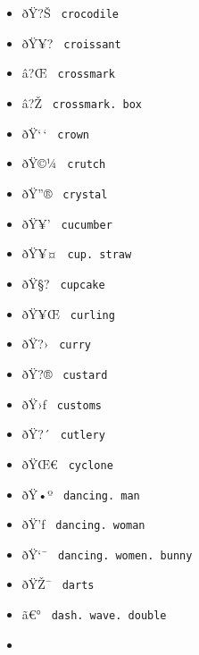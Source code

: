 \begin{itemize}
\item
  \label{symbol-crocodile}{{ ðŸ?Š }
  \texttt{\ crocodile\ }}
\item
  \label{symbol-croissant}{{ ðŸ¥? }
  \texttt{\ croissant\ }}
\item
  \label{symbol-crossmark}{{ â?Œ }
  \texttt{\ crossmark\ }}
\item
  \label{symbol-crossmark.box}{{ â?Ž }
  \texttt{\ crossmark.\ box\ }}
\item
  \label{symbol-crown}{{ ðŸ`\,` } \texttt{\ crown\ }}
\item
  \label{symbol-crutch}{{ ðŸ©¼ } \texttt{\ crutch\ }}
\item
  \label{symbol-crystal}{{ ðŸ''® } \texttt{\ crystal\ }}
\item
  \label{symbol-cucumber}{{ ðŸ¥' } \texttt{\ cucumber\ }}
\item
  \label{symbol-cup.straw}{{ ðŸ¥¤ }
  \texttt{\ cup.\ straw\ }}
\item
  \label{symbol-cupcake}{{ ðŸ§? } \texttt{\ cupcake\ }}
\item
  \label{symbol-curling}{{ ðŸ¥Œ } \texttt{\ curling\ }}
\item
  \label{symbol-curry}{{ ðŸ?› } \texttt{\ curry\ }}
\item
  \label{symbol-custard}{{ ðŸ?® } \texttt{\ custard\ }}
\item
  \label{symbol-customs}{{ ðŸ›ƒ } \texttt{\ customs\ }}
\item
  \label{symbol-cutlery}{{ ðŸ?´ } \texttt{\ cutlery\ }}
\item
  \label{symbol-cyclone}{{ ðŸŒ€ } \texttt{\ cyclone\ }}
\item
  \label{symbol-dancing.man}{{ ðŸ•º }
  \texttt{\ dancing.\ man\ }}
\item
  \label{symbol-dancing.woman}{{ ðŸ'ƒ }
  \texttt{\ dancing.\ woman\ }}
\item
  \label{symbol-dancing.women.bunny}{{ ðŸ`¯ }
  \texttt{\ dancing.\ women.\ bunny\ }}
\item
  \label{symbol-darts}{{ ðŸŽ¯ } \texttt{\ darts\ }}
\item
  \label{symbol-dash.wave.double}{{ ã€° }
  \texttt{\ dash.\ wave.\ double\ }}
\item

\end{itemize}
